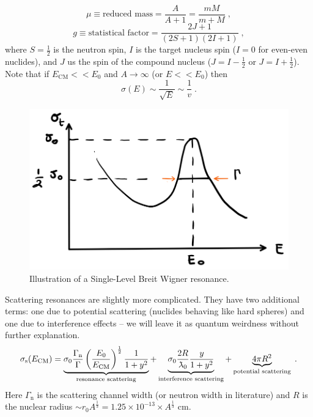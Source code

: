 \begin{equation*}
    \mu \equiv \text{reduced mass} = \frac{A}{A+1} = \frac{mM}{m + M}\;\mathrm{,}
\end{equation*}
\begin{equation*}
    g \equiv \text{statistical factor} = \frac{2J+1}{(2S+1)(2I+1)}\;\mathrm{,}
\end{equation*}
where $S=\frac{1}{2}$ is the neutron spin, $I$ is the target nucleus spin ($I=0$ for even-even nuclides), and $J$ us the spin of the compound nucleus ($J = I - \frac{1}{2}$ or $J = I + \frac{1}{2}$). %
Note that if $E_\mathrm{CM}<< E_0$ and $A\rightarrow\infty$ (or $E << E_0$) then
\begin{equation*}
    \sigma(E) \sim \frac{1}{\sqrt{E}} \sim \frac{1}{v}\;\mathrm{.}
\end{equation*}

\begin{figure}[h!]
  \centering
  \includegraphics[scale=0.60]{./Figures/P3/slbw.png} 
  \caption{Illustration of a Single-Level Breit Wigner resonance.} 
  \label{fig:resSLBW}
\end{figure}

Scattering resonances are slightly more complicated. They have two additional terms: one due to potential scattering (nuclides behaving like hard spheres) and one due to interference effects -- we will leave it as quantum weirdness without further explanation.
\begin{equation*}
    \sigma_\mathrm{s}(E_\mathrm{CM}) = \underbrace{\sigma_0\frac{\Gamma_\mathrm{n}}{\Gamma}\left(\frac{E_0}{E_\mathrm{CM}}\right)^{\frac{1}{2}}\frac{1}{1+y^2}}_{\text{resonance scattering}} + \underbrace{\sigma_0 \frac{2R}{\lambdabar_0}\frac{y}{1+y^2}}_{\text{interference scattering}} + \underbrace{4\pi R^2}_{\text{potential scattering}}\;\mathrm{.}
\end{equation*}
Here $\Gamma_\mathrm{n}$ is the scattering channel width (or neutron width in literature) and $R$ is the nuclear radius $\sim r_0 A^\frac{1}{3} = 1.25\times 10^{-13}\times A^{\frac{1}{3}}$ cm.

